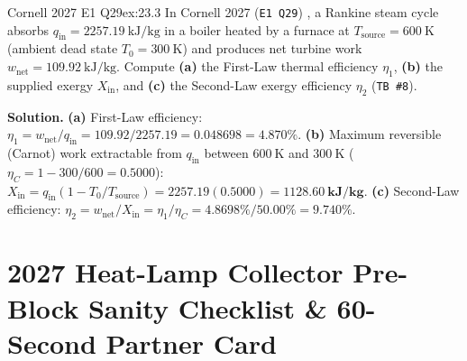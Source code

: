 \begin{workedexample}{Cornell 2027 E1 Q29}{ex:23.3}
In Cornell 2027 (\texttt{E1 Q29}) , a Rankine steam cycle absorbs $q_{\mathrm{in}} = \SI{2257.19}{\kilo\joule\per\kilogram}$ in a boiler heated by a furnace at $T_{\mathrm{source}} = \SI{600}{\kelvin}$ (ambient dead state $T_0 = \SI{300}{\kelvin}$) and produces net turbine work $w_{\mathrm{net}} = \SI{109.92}{\kilo\joule\per\kilogram}$. Compute \textbf{(a)} the First-Law thermal efficiency $\eta_1$, \textbf{(b)} the supplied exergy $X_{\mathrm{in}}$, and \textbf{(c)} the Second-Law exergy efficiency $\eta_2$ (\texttt{TB \#8}).

\textbf{Solution.}
\textbf{(a)} First-Law efficiency: $\eta_1 = w_{\mathrm{net}}/q_{\mathrm{in}} = 109.92 / 2257.19 = 0.048698 = \mathbf{4.870\%}$.
\textbf{(b)} Maximum reversible (Carnot) work extractable from $q_{\mathrm{in}}$ between $\SI{600}{\kelvin}$ and $\SI{300}{\kelvin}$ ($\eta_C = 1 - 300/600 = 0.5000$): $X_{\mathrm{in}} = q_{\mathrm{in}}(1 - T_0/T_{\mathrm{source}}) = 2257.19(0.5000) = \mathbf{\SI{1128.60}{\kilo\joule\per\kilogram}}$.
\textbf{(c)} Second-Law efficiency: $\eta_2 = w_{\mathrm{net}}/X_{\mathrm{in}} = \eta_1/\eta_C = 4.8698\% / 50.00\% = \mathbf{9.740\%}$.
\end{workedexample}

\section{2027 Heat-Lamp Collector Pre-Block Sanity Checklist \& 60-Second Partner Card}\label{sec:23.7}

